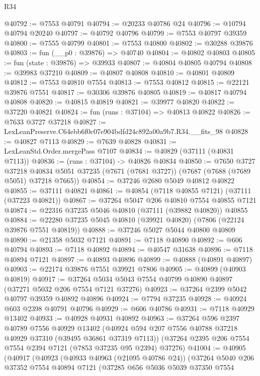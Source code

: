 \begin{lexlean}{R34}
\begin{coremodule}
@40792 := @7553 @40791
@40794 := @20233 @40786 @24
@40796 := @10794 @40794 @20240
@40797 := @40792 @40796
@40799 := @7553 @40797 @39359
@40800 := @7555 @40799
@40801 := @7553 @40800
@40802 := @30288 @39876
@40803 := fun (__p0 : @39876) => @40740
@40804 := @40802 @40803
@40805 := fun (state : @39876) => @39933
@40807 := @40804 @40805 @40794
@40808 := @39983 @37210
@40809 := @40807 @40808
@40810 := @40801 @40809
@40812 := @7553 @40810 @7554
@40813 := @7553 @40812
@40815 := @22121 @39876 @7551
@40817 := @30306 @39876 @40805
@40819 := @40817 @40794 @40808
@40820 := @40815 @40819
@40821 := @39977 @40820
@40822 := @37220 @40821
@40824 := fun (runs : @37104) => @40813 @40822
@40826 := @7633 @3727 @37218
@40827 := LexLeanPreserve.C64ebb6f0c07e904bdfd24c892a00a9b7.R34.__fits_98
@40828 := @40827 @7113
@40829 := @7639 @40828
@40831 := LexLeanStd.Order.mergePass @7107
@40834 := @40829 (@37111 (@40831 @7113))
@40836 := (runs : @37104) -> @40826 @40834
@40850 := @7650
    @3727
    @37218
    @40834
    @5051
    @37235
    (@7671 (@7681 @3727))
    (@7687 (@7688 (@7689 @5051) @37218 @7665))
@40854 := @37246 @2680 @5049 @40812 @40822
@40855 := @37111 @40821
@40861 := @40854 (@7118 @40855 @7121) (@37111 (@37223 @40821))
@40867 := @37264 @5047 @206 @40810 @7554 @40855 @7121
@40874 := @22316 @37235 @5046 @40810 (@37111 (@39882 @40820)) @40855
@40884 := @22280 @37235 @5045 @40810 (@39921 @40820) (@7806 (@22124 @39876 @7551 @40819))
@40888 := @37246 @5027 @5044 @40800 @40809
@40890 := @21358 @5032 @7121
@40891 := @7118 @40890
@40892 := @606 @40794
@40893 := @7118 @40892
@40894 := @40547 @31638
@40896 := @7118 @40894 @7121
@40897 := @40893 @40896
@40899 := @40888 (@40891 @40897)
@40903 := @22174 @39876 @7551 @39921 @7806
@40905 := @40899 (@40903 @40819)
@40917 := @37264 @5034 @5043 @7554 @40799 @40890 @40897 (@37271 @5032 @206 @7554 @7121 @37276)
@40923 := @37264 @2399 @5042 @40797 @39359 @40892 @40896
@40924 := @7794 @37235
@40928 := @40924 @603 @2398 @40791 @40796
@40929 := @606 @40786
@40931 := @7118 @40929 @13402
@40933 := @40928 @40931 @40892
@40963 := @37264
    @596
    @2397
    @40789
    @7556
    @40929
    @13402
    (@40924 @594 @207 @7556 @40788 @37218 @40929 @37310 (@39495 @36861 @37319 @7113))
    (@37264 @2395 @206 @7554 @7554 @2394 @7121 (@7853 @37235 @95 @2394) @37276)
@41004 := @40905
    (@40917
      (@40923
        (@40933 @40963 (@21095 @40786 @24))
        (@37264
          @5040
          @206
          @37352
          @7554
          @40894
          @7121
          (@37285
            @656
            @5036
            @5039
            @37350
            @7554

\end{coremodule}
\end{lexlean}
